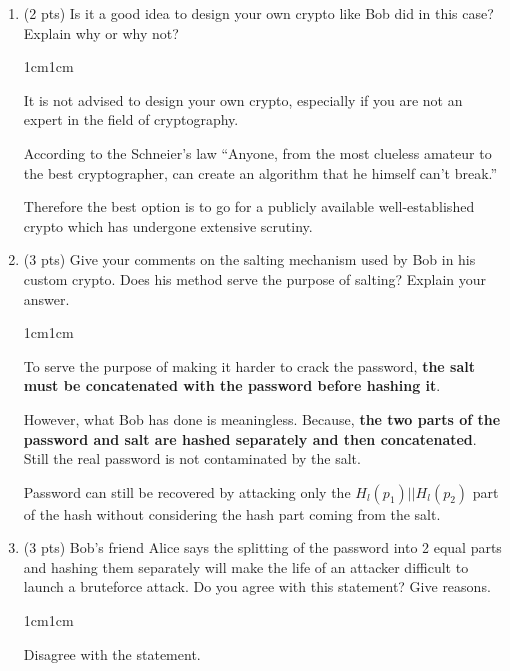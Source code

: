 \documentclass[11pt,letterpaper]{article}
\newenvironment{answer}{\em \color{blue} \begin{adjustwidth}{1cm}{1cm}}{\end{adjustwidth}}
\begin{document}
	
	\begin{enumerate}
		
		\item (2 pts) Is it a good idea to design your own crypto like Bob did in this case? Explain why or why not?
		
		\begin{answer}
			
			It is not advised to design your own crypto, especially if you are not an expert in the field of cryptography. 
			
			According to the Schneier's law ``Anyone, from the most clueless amateur to the best cryptographer, can create an 
			algorithm that he himself can't break.'' 
			
			Therefore the best option is to go for a publicly available well-established crypto which has undergone extensive scrutiny.
			
		\end{answer}
		
		\item (3 pts) Give your comments on the salting mechanism used by Bob in his custom crypto. Does his method serve the purpose of salting? Explain your answer.
		
		\begin{answer}
			
			To serve the purpose of making it harder to crack the password, \textbf{the salt must be concatenated with the password before hashing it}. 
			
			However, what Bob has done is meaningless. Because, \textbf{the two parts of the password and salt are hashed separately and then concatenated}. Still the real password is not contaminated by the salt. 
			
			Password can still be recovered by attacking only the 	$H_l(p_1) || H_l(p_2)$ part of the hash without considering the hash part coming from the salt.
			
		\end{answer}
		
		\item (3 pts)  Bob’s friend Alice says the splitting of the password into 2 equal parts and hashing them separately will make the life of an attacker difficult to launch a bruteforce attack. Do you agree with this statement? Give reasons.
		
		\begin{answer}
			
			Disagree with the statement.
			

\end{answer}
\end{enumerate}
\end{document}
